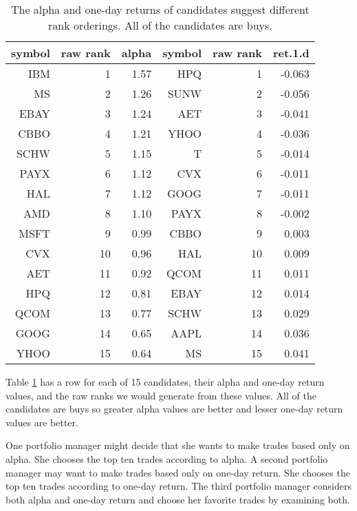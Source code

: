 \documentclass{article}
\begin{document}
\begin{table}[!htbp]
  \begin{tabular}[c]{|r|r|r|r|r|r|}
    \hline
    symbol & raw rank & alpha & symbol & raw rank  & ret.1.d \\
      \hline
     IBM   &  1  & 1.57  &  HPQ &  1 & -0.063 \\
     MS    &  2  & 1.26  & SUNW &  2 & -0.056 \\
     EBAY  &  3  & 1.24  &  AET &  3 & -0.041 \\
     CBBO  &  4  & 1.21  & YHOO &  4 & -0.036 \\
     SCHW  &  5  & 1.15  &    T &  5 & -0.014 \\
     PAYX  &  6  & 1.12  &  CVX &  6 & -0.011 \\
     HAL   &  7  & 1.12  & GOOG &  7 & -0.011 \\
     AMD   &  8  & 1.10  & PAYX &  8 & -0.002 \\
     MSFT  &  9  & 0.99  & CBBO &  9 &  0.003 \\
     CVX   & 10  & 0.96  &  HAL & 10 &  0.009 \\
     AET   & 11  & 0.92  & QCOM & 11 &  0.011 \\
     HPQ   & 12  & 0.81  & EBAY & 12 &  0.014 \\
     QCOM  & 13  & 0.77  & SCHW & 13 &  0.029 \\
     GOOG  & 14  & 0.65  & AAPL & 14 &  0.036 \\
     YHOO  & 15  & 0.64  &   MS & 15 &  0.041 \\
     \hline  
  \end{tabular}
  \caption[alpha and one-day return ranks]{The alpha and one-day
  returns of candidates suggest different rank orderings.  All of the
  candidates are buys.\label{theory table 1}}
\end{table}
      
Table \ref{theory table 1} has a row for each of 15 candidates, their
alpha and one-day return values, and the raw ranks we would generate
from these values.  All of the candidates are buys so greater alpha
values are better and lesser one-day return values are better.

One portfolio manager might decide that she wants to make trades based
only on alpha.  She chooses the top ten trades according to alpha.  A
second portfolio manager may want to make trades based only on one-day
return.  She chooses the top ten trades according to one-day return.
The third portfolio manager considers both alpha and one-day return
and choose her favorite trades by examining both.  
\end{document}
